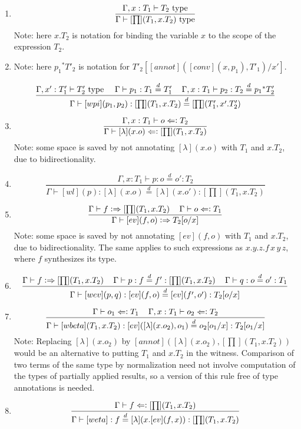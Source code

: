 \documentclass[11pt]{article}
\newcommand{\eqd}{\stackrel{d}{=}}
\newcommand{\spc}{{\,\,\,\,\,\,\,}}
\newcommand{\synth}{\vcentcolon\Rightarrow}
\newcommand{\force}{\Leftarrow\vcentcolon}
\newcommand{\Type}{\mathop{{\, \rm type}}}
\begin{document}
\begin{enumerate}
\item 
$$\frac{\Gamma, x:T_1\vdash T_2\Type}{\Gamma\vdash [\prod](T_1,x.T_2)\Type}$$
Note: here $x.T_2$ is notation for binding the variable $x$ to the scope of the expression $T_2$.
\item 
Note: here ${p_1}^*T'_2$ is notation for $T'_2[[annot]([conv](x,p_1),T'_1)/x']$.

$$ \frac{ 
  \Gamma, x':T'_1 \vdash T'_2\Type \spc 
  \Gamma\vdash p_1:T_1\eqd T_1' \spc
  \Gamma, x:T_1 \vdash p_2:T_2\eqd {p_1}^*T_2'
  } {
  \Gamma\vdash [wpi](p_1,p_2):[\prod](T_1,x.T_2)\eqd [\prod](T_1',x'.T'_2)
}$$

\item 
$$\frac{\Gamma, x : T_1\vdash o \force T_2}{\Gamma\vdash [\lambda](x.o) \force [\prod](T_1,x.T_2)}$$
Note: some space is saved by not annotating $[\lambda](x.o)$ with $T_1$ and $x.T_2$, due to bidirectionality.

\item 
$$\frac{\Gamma, x:T_1\vdash p : o\eqd o' : T_2}{\Gamma\vdash [wl](p) : [\lambda](x.o)\eqd [\lambda](x.o') : [\prod](T_1,x.T_2)}$$
\item 
$$\frac{\Gamma\vdash f \synth [\prod](T_1,x.T_2)\spc \Gamma\vdash o \force T_1}{\Gamma\vdash [ev](f,o) \synth T_2[o/x]}$$
Note: some space is saved by not annotating $[ev](f,o)$ with $T_1$ and $x.T_2$, due to bidirectionality.  The same applies to such expressions
as $x.y.z.f\, x\, y\, z$, where $f$ synthesizes its type.
\item 
$$\frac{\Gamma\vdash f \synth [\prod](T_1,x.T_2) \spc \Gamma\vdash p : f \eqd f' : [\prod](T_1,x.T_2)\spc \Gamma\vdash q : o \eqd o' : T_1}{\Gamma\vdash [wev](p,q) : [ev](f,o) \eqd [ev](f',o') : T_2[o/x]}$$
\item 
$$\frac{ \Gamma\vdash o_1 \force T_1\spc \Gamma, x:T_1\vdash o_2 \force T_2}{\Gamma\vdash [wbeta](T_1,x.T_2) : [ev]([\lambda](x.o_2),o_1) \eqd o_2[o_1/x] : T_2[o_1/x]}$$
Note: Replacing $[\lambda](x.o_2)$ by $[annot]([\lambda](x.o_2),[\prod](T_1,x.T_2))$ would be an alternative to putting $T_1$ and $x.T_2$ in the witness.
Comparison of two terms of the same type by normalization need not involve
computation of the types of partially applied results, so a version of this
rule free of type annotations is needed.
\item 
$$\frac{\Gamma\vdash f \force [\prod](T_1,x.T_2)}{\Gamma\vdash [weta] : f \eqd [\lambda](x.[ev](f,x)) : [\prod](T_1,x.T_2)}$$ 

\end{enumerate}



\end{document}
